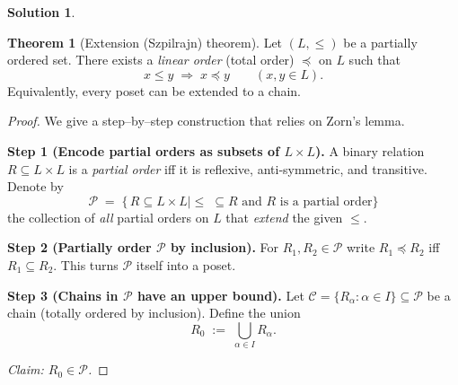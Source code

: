 \documentclass[12pt]{article}
\theoremstyle{definition} %
\newtheorem{solution}{Solution}
\newtheorem{theorem}{Theorem}
\theoremstyle{plain} %
\begin{document}
    \begin{solution}
      \begin{theorem}[Extension (Szpilrajn) theorem]
        \label{thm:poset-extension}
        Let $(L,\le)$ be a partially ordered set.
        There exists a \emph{linear order} (total order) $\preceq$ on $L$
        such that
        \[
          x\le y \;\Longrightarrow\; x\preceq y
          \qquad(x,y\in L).
        \]
        Equivalently, every poset can be extended to a chain.
        \end{theorem}
        
        \begin{proof}
        We give a step–by–step construction that relies on Zorn’s lemma.
        
        \bigskip
        \textbf{Step 1 (Encode partial orders as subsets of $L\times L$).}
        A binary relation \(R\subseteq L\times L\) is a \emph{partial order}
        iff it is reflexive, anti‑symmetric, and transitive.
        Denote by
        \[
          \mathcal P \;=\;
          \bigl\{\,R \subseteq L\times L
                  \mid
                  \le\;\subseteq R
                  \text{ and $R$ is a partial order}
           \bigr\}
        \]
        the collection of \emph{all} partial orders on $L$
        that \emph{extend} the given $\le$.
        
        \bigskip
        \textbf{Step 2 (Partially order $\mathcal P$ by inclusion).}
        For $R_1,R_2\in\mathcal P$ write $R_1\preccurlyeq R_2$ iff
        $R_1\subseteq R_2$.
        This turns $\mathcal P$ itself into a poset.
        
        \bigskip
        \textbf{Step 3 (Chains in $\mathcal P$ have an upper bound).}
        Let
        \(
          \mathcal C=\{R_\alpha : \alpha\in I\}\subseteq\mathcal P
        \)
        be a chain (totally ordered by inclusion).
        Define the union
        \[
          R_0\;:=\;\bigcup_{\alpha\in I} R_\alpha.
        \]
        
        \emph{Claim: $R_0\in\mathcal P$.}
        

\end{proof}
\end{solution}
\end{document}
